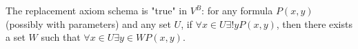 The replacement axiom schema is "true" in $V^B$: for any formula $P(x,y)$ (possibly with parameters) and any set $U$, if $\forall x \in U \exists! y P(x,y)$, then there exists a set $W$ such that $\forall x \in U \exists y \in W P(x,y)$.